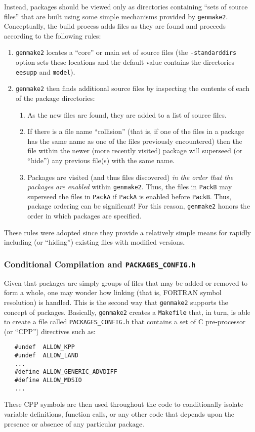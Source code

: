 Instead, packages should be viewed only as directories containing
``sets of source files'' that are built using some simple mechanisms
provided by \texttt{genmake2}.  Conceptually, the build process adds
files as they are found and proceeds according to the following rules:
\begin{enumerate}
\item \texttt{genmake2} locates a ``core'' or main set of source files
  (the \texttt{-standarddirs} option sets these locations and the
  default value contains the directories \texttt{eesupp} and
  \texttt{model}).
  
\item \texttt{genmake2} then finds additional source files by
  inspecting the contents of each of the package directories:
  \begin{enumerate}
  \item As the new files are found, they are added to a list of source
    files.

  \item If there is a file name ``collision'' (that is, if one of the
    files in a package has the same name as one of the files
    previously encountered) then the file within the newer (more
    recently visited) package will superseed (or ``hide'') any
    previous file(s) with the same name.
    
  \item Packages are visited (and thus files discovered) {\it in the
      order that the packages are enabled} within \texttt{genmake2}.
    Thus, the files in \texttt{PackB} may superseed the files in
    \texttt{PackA} if \texttt{PackA} is enabled before \texttt{PackB}.
    Thus, package ordering can be significant!  For this reason,
    \texttt{genmake2} honors the order in which packages are
    specified.
  \end{enumerate}
\end{enumerate}

These rules were adopted since they provide a relatively simple means
for rapidly including (or ``hiding'') existing files with modified
versions.

\subsubsection{Conditional Compilation and \texttt{PACKAGES\_CONFIG.h}}

Given that packages are simply groups of files that may be added or
removed to form a whole, one may wonder how linking (that is, FORTRAN
symbol resolution) is handled.  This is the second way that
\texttt{genmake2} supports the concept of packages.  Basically,
\texttt{genmake2} creates a \texttt{Makefile} that, in turn, is able
to create a file called \texttt{PACKAGES\_CONFIG.h} that contains a set
of C pre-processor (or ``CPP'') directives such as:
\begin{verbatim}
   #undef  ALLOW_KPP
   #undef  ALLOW_LAND
   ...
   #define ALLOW_GENERIC_ADVDIFF
   #define ALLOW_MDSIO
   ...
\end{verbatim}
These CPP symbols are then used throughout the code to conditionally
isolate variable definitions, function calls, or any other code that
depends upon the presence or absence of any particular package.

